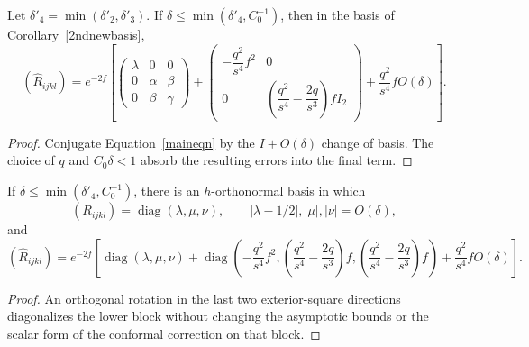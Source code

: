 \begin{lemma}
\label{lem:rhat-matrix-adapted-basis}

\label{Rhatmatrix}
Let $\delta'_4=\min(\delta'_2,\delta'_3)$. If
$\delta\leq\min(\delta'_4,C_0^{-1})$, then in the basis of
Corollary~\ref{2ndnewbasis},
\[
(\widehat R_{ijkl})=e^{-2f}\left[
\begin{pmatrix}\lambda&0&0\\0&\alpha&\beta\\0&\beta&\gamma\end{pmatrix}
+\begin{pmatrix}
-\dfrac{q^2}{s^4}f^2&0\\
0&\left(\dfrac{q^2}{s^4}-\dfrac{2q}{s^3}\right)fI_2
\end{pmatrix}
+\frac{q^2}{s^4}fO(\delta)\right].
\]
\end{lemma}

\begin{proof}
\sketch
{}
Conjugate Equation~\eqref{maineqn} by the $I+O(\delta)$ change of basis.
The choice of $q$ and $C_0\delta<1$ absorb the resulting errors into the final
term.
\end{proof}

\begin{corollary}
\label{cor:diagonalized-curvature-matrices}
\label{13.10}

If $\delta\leq\min(\delta'_4,C_0^{-1})$, there is an $h$-orthonormal basis in
which
\[
  (R_{ijkl})=\operatorname{diag}(\lambda,\mu,\nu),
  \qquad
  |\lambda-1/2|,|\mu|,|\nu|=O(\delta),
\]
and
\[
  (\widehat R_{ijkl})=e^{-2f}\left[
  \operatorname{diag}(\lambda,\mu,\nu)
  +\operatorname{diag}\left(-\frac{q^2}{s^4}f^2,
  \left(\frac{q^2}{s^4}-\frac{2q}{s^3}\right)f,
  \left(\frac{q^2}{s^4}-\frac{2q}{s^3}\right)f\right)
  +\frac{q^2}{s^4}fO(\delta)\right].
\]
\end{corollary}

\begin{proof}
\sketch
{}
An orthogonal rotation in the last two exterior-square directions diagonalizes
the lower block without changing the asymptotic bounds or the scalar form of
the conformal correction on that block.
\end{proof}

